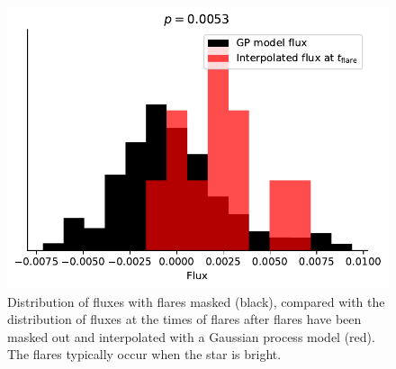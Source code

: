 \begin{figure}
\begin{center}
\includegraphics[scale=0.6]{trappist1_bright/flare_flux_distribution.pdf}
\end{center}
\caption{Distribution of fluxes with flares masked (black), compared with the distribution of fluxes at the times of flares after flares have been masked out and interpolated with a Gaussian process model (red). The flares typically occur when the star is bright. \label{fig:flare_dist}}
\end{figure}

